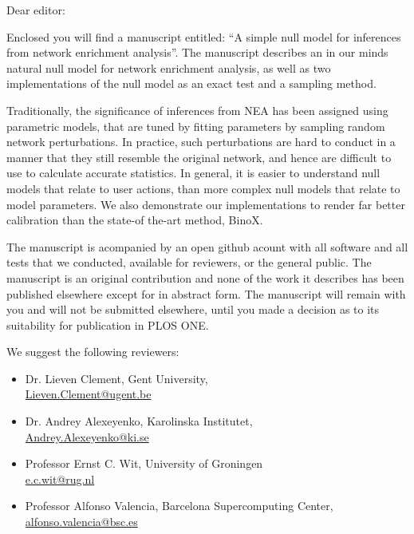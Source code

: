 \documentclass[a4paper]{letter}
\begin{document}
\begin{letter}{}
\vspace*{-5.0cm}

\opening{Dear editor:}

Enclosed you will find a manuscript entitled: ``A simple null model for inferences from network enrichment analysis''. The manuscript describes an in our minds natural null model for network enrichment analysis, as well as two implementations of the null model as an exact test and a sampling method.

Traditionally, the significance of inferences from NEA has been assigned using parametric models, that are tuned by fitting parameters by sampling random network perturbations.  In practice, such perturbations are hard to conduct in a manner that they still resemble the original network, and hence are difficult to use to calculate accurate statistics. In general, it is easier to understand null models that relate to user actions, than more complex null models that relate to model parameters. We also demonstrate our implementations to render far better calibration than the state-of the-art method, BinoX.

\vspace{0.15cm}

The manuscript is acompanied by an open github acount with all software and all tests that we conducted, available for reviewers, or the general public. The manuscript is an original contribution and none of the work it describes has been published elsewhere except for in abstract form. The manuscript will remain with you and will not be submitted elsewhere, until you made a decision as to its suitability for publication in PLOS ONE.

We suggest the following reviewers:

\begin{itemize}

\item Dr. Lieven Clement,
Gent University, \\
\url{Lieven.Clement@ugent.be}

\item Dr. Andrey Alexeyenko, Karolinska Institutet, \\
\url{Andrey.Alexeyenko@ki.se}

\item Professor Ernst C. Wit, University of Groningen\\
\url{e.c.wit@rug.nl}

\item Professor Alfonso Valencia, Barcelona Supercomputing Center,\\
\url{alfonso.valencia@bsc.es}


\end{itemize}
\end{letter}
\end{document}
